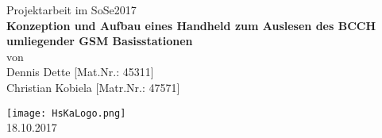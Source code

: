 %
%
\begin{titlepage}
\begin{center}
         {\large  Projektarbeit im SoSe2017\\}
  \vspace{10mm}
         {\Large
	\textbf{Konzeption und Aufbau eines Handheld zum Auslesen des BCCH umliegender GSM Basisstationen }\\}
  \vspace{10mm}
         {\large von}\\
         {\large Dennis Dette [Mat.Nr.: 45311] 
          \\ Christian Kobiela [Matr.Nr.: 47571]}\\
  \vfill
  
  \vspace{5mm}
                  \texttt{[image: HsKaLogo.png]}\\
  \vspace{5mm}
  \vspace{10mm}
         {\large 18.10.2017}
\end{center}
\end{titlepage}

\clearpage
\thispagestyle{empty}
\cleardoublepage
